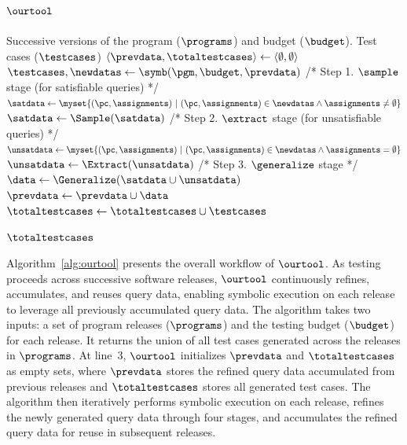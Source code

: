 \subsection{$\ourtool$}\label{sec:ourtool}
\begin{algorithm}[t] \footnotesize
  \caption{Query Data Refinement with $\ourtool$}
  \label{alg:ourtool}
  \begin{algorithmic}[1]
    \Require Successive versions of the program ($\programs$) and budget ($\budget$).
    \Ensure Test cases ($\testcases$)
    \State $\langle \prevdata, \totaltestcases \rangle \gets \langle \emptyset, \emptyset \rangle$
        \State $\testcases, \newdatas \gets \symb(\pgm, \budget, \prevdata)$
        \State
        \State /* Step 1. $\sample$ stage (for satisfiable queries) */
        \State $\satdata \gets \myset{(\pc, \assignments) \ | \ (\pc, \assignments) \in \newdatas \land \assignments \neq \emptyset}$
        \State $\satdata \gets \Sample(\satdata)$        
        \State
        \State /* Step 2. $\extract$ stage (for unsatisfiable queries) */
        \State $\unsatdata \gets \myset{(\pc, \assignments) \ | \ (\pc, \assignments) \in \newdatas \land \assignments = \emptyset}$
        \State $\unsatdata \gets \Extract(\unsatdata)$  
        \State
        \State /* Step 3. $\generalize$ stage */
        \State $\data \gets \Generalize(\satdata \cup \unsatdata)$     
        \State $\prevdata \gets \prevdata \cup \data$
        \State $\totaltestcases \gets \totaltestcases \cup \testcases$
        
    \EndFor
    \State \Return $\totaltestcases$
\end{algorithmic}
\end{algorithm}

Algorithm~\ref{alg:ourtool} presents the overall workflow of $\ourtool$. As testing proceeds across successive software releases, $\ourtool$ continuously refines, accumulates, and reuses query data, enabling symbolic execution on each release to leverage all previously accumulated query data. The algorithm takes two inputs: a set of program releases ($\programs$) and the testing budget ($\budget$) for each release. It returns the union of all test cases generated across the releases in $\programs$. At line~3, $\ourtool$ initializes $\prevdata$ and $\totaltestcases$ as empty sets, where $\prevdata$ stores the refined query data accumulated from previous releases and $\totaltestcases$ stores all generated test cases. The algorithm then iteratively performs symbolic execution on each release, refines the newly generated query data through four stages, and accumulates the refined query data for reuse in subsequent releases. 

